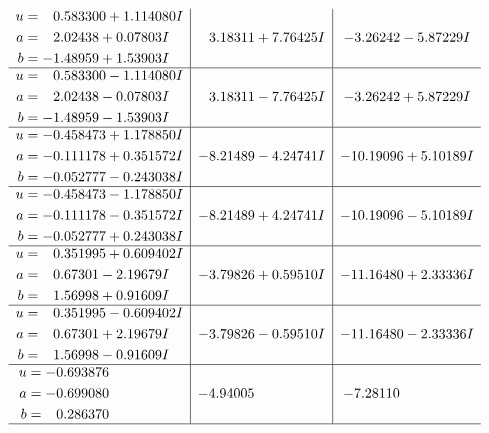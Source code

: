 \documentclass[1p]{elsarticle_modified}
\theoremstyle{definition}
\begin{document}
$$\begin{array}{c|c|c}
\begin{aligned}
u &= \phantom{-}0.583300 + 1.114080 I \\
a &= \phantom{-}2.02438 + 0.07803 I \\
b &= -1.48959 + 1.53903 I\end{aligned}
 & \phantom{-}3.18311 + 7.76425 I & -3.26242 - 5.87229 I \\ \hline\begin{aligned}
u &= \phantom{-}0.583300 - 1.114080 I \\
a &= \phantom{-}2.02438 - 0.07803 I \\
b &= -1.48959 - 1.53903 I\end{aligned}
 & \phantom{-}3.18311 - 7.76425 I & -3.26242 + 5.87229 I \\ \hline\begin{aligned}
u &= -0.458473 + 1.178850 I \\
a &= -0.111178 + 0.351572 I \\
b &= -0.052777 - 0.243038 I\end{aligned}
 & -8.21489 - 4.24741 I & -10.19096 + 5.10189 I \\ \hline\begin{aligned}
u &= -0.458473 - 1.178850 I \\
a &= -0.111178 - 0.351572 I \\
b &= -0.052777 + 0.243038 I\end{aligned}
 & -8.21489 + 4.24741 I & -10.19096 - 5.10189 I \\ \hline\begin{aligned}
u &= \phantom{-}0.351995 + 0.609402 I \\
a &= \phantom{-}0.67301 - 2.19679 I \\
b &= \phantom{-}1.56998 + 0.91609 I\end{aligned}
 & -3.79826 + 0.59510 I & -11.16480 + 2.33336 I \\ \hline\begin{aligned}
u &= \phantom{-}0.351995 - 0.609402 I \\
a &= \phantom{-}0.67301 + 2.19679 I \\
b &= \phantom{-}1.56998 - 0.91609 I\end{aligned}
 & -3.79826 - 0.59510 I & -11.16480 - 2.33336 I \\ \hline\begin{aligned}
u &= -0.693876\phantom{ +0.000000I} \\
a &= -0.699080\phantom{ +0.000000I} \\
b &= \phantom{-}0.286370\phantom{ +0.000000I}\end{aligned}
 & -4.94005\phantom{ +0.000000I} & -7.28110\phantom{ +0.000000I}\\
 \hline 
 \end{array}$$\newpage\newpage\renewcommand{\arraystretch}{1}
\end{document}
